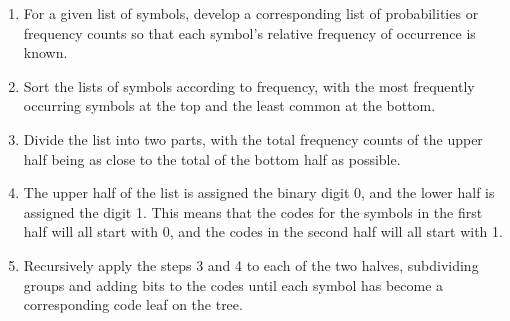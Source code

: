 \documentclass[12pt, a4paper]{report}
\begin{document}
\begin{enumerate}
  \item For a given list of symbols, develop a corresponding list of probabilities or frequency counts so that each symbol's
  relative frequency of occurrence is known.
  \item Sort the lists of symbols according to frequency, with the most frequently occurring symbols at the top and the least
  common at the bottom.
  \item Divide the list into two parts, with the total frequency counts of the upper half being as close to the total of the
  bottom half as possible.
  \item The upper half of the list is assigned the binary digit 0, and the lower half is assigned the digit 1. This means
  that the codes for the symbols in the first half will all start with 0, and the codes in the second half will all start
  with 1.
  \item Recursively apply the steps 3 and 4 to each of the two halves, subdividing groups and adding bits to the codes
  until each symbol has become a corresponding code leaf on the tree.
\end{enumerate}
\end{document}
